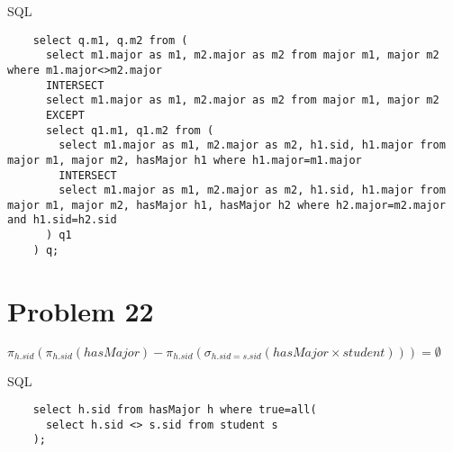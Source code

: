 \documentclass{article}
\begin{document}
  \vspace{10pt}
  \noindent\small{SQL}

  \tiny{
  \begin{verbatim}
    select q.m1, q.m2 from (
      select m1.major as m1, m2.major as m2 from major m1, major m2 where m1.major<>m2.major
      INTERSECT
      select m1.major as m1, m2.major as m2 from major m1, major m2 
      EXCEPT
      select q1.m1, q1.m2 from (
        select m1.major as m1, m2.major as m2, h1.sid, h1.major from major m1, major m2, hasMajor h1 where h1.major=m1.major
        INTERSECT
        select m1.major as m1, m2.major as m2, h1.sid, h1.major from major m1, major m2, hasMajor h1, hasMajor h2 where h2.major=m2.major and h1.sid=h2.sid
      ) q1
    ) q;
  \end{verbatim}
  }

  \section*{Problem 22}

  $
  \pi_{h.sid}(\pi_{h.sid}(hasMajor) - \pi_{h.sid}(\sigma_{h.sid=s.sid}(hasMajor \times student))) = \emptyset
  $

  \vspace{10pt}
  \noindent\small{SQL}

  \tiny{
  \begin{verbatim}
    select h.sid from hasMajor h where true=all(
      select h.sid <> s.sid from student s
    );
  \end{verbatim}
  }
\end{document}
